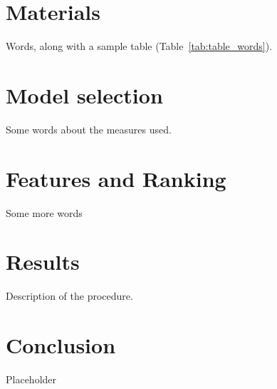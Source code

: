\documentclass[stu,12pt,floatsintext]{apa7}
\begin{document}
\section{Materials}

Words, along with a sample table (Table~\ref{tab:table_words}).


\section{Model selection}

Some words about the measures used.

\section{Features and Ranking}
Some more words


\section{Results}

Description of the procedure.

\section{Conclusion}
Placeholder

\printbibliography
\end{document}
